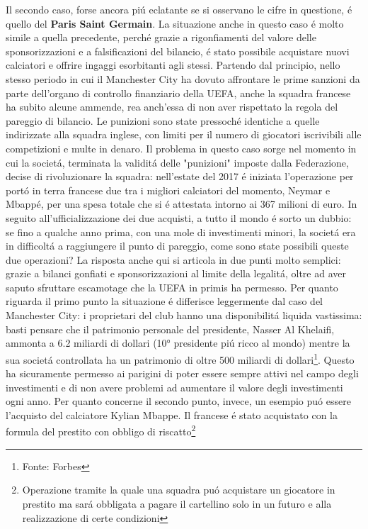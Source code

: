 \documentclass[
    corpo=12pt,
    oneside,
    evenboxes,
    tipotesi=triennale,
    stile=classica,
    oldstyle,
    autoretitolo,
    greek,
]{toptesi}
\begin{document}
\begin{interlinea}{1.5}
Il secondo caso, forse ancora pi\'u eclatante se si osservano le cifre in questione, \'e quello del \textbf{Paris Saint Germain}. 
La situazione anche in questo caso \'e molto simile a quella precedente, perch\'e grazie a rigonfiamenti del valore
delle sponsorizzazioni e a falsificazioni del bilancio, \'e stato possibile acquistare nuovi calciatori e offrire ingaggi esorbitanti agli stessi.
Partendo dal principio, nello stesso periodo in cui il Manchester City ha dovuto affrontare le prime sanzioni da parte dell'organo di controllo
finanziario della UEFA, anche la squadra francese ha subito alcune ammende, rea anch'essa di non aver rispettato la regola del pareggio di bilancio. 
Le punizioni sono state pressoch\'e identiche a quelle indirizzate alla squadra inglese, con limiti per il numero di giocatori iscrivibili alle 
competizioni e multe in denaro. Il problema in questo caso sorge nel momento in cui la societ\'a, terminata la validit\'a delle "punizioni"
imposte dalla Federazione, decise di rivoluzionare la squadra: nell'estate del 2017 \'e iniziata l'operazione per port\'o in terra francese
due tra i migliori calciatori del momento, Neymar e Mbapp\'e, per una spesa totale che si \'e attestata intorno ai 367 
milioni di euro. In seguito all'ufficializzazione dei due acquisti, a tutto il mondo \'e sorto un dubbio: se fino a qualche anno prima,
con una mole di investimenti minori, la societ\'a era in difficolt\'a a raggiungere il punto di pareggio, come sono state possibili queste due 
operazioni? La risposta anche qui si articola in due punti molto semplici: grazie a bilanci gonfiati e sponsorizzazioni al 
limite della legalit\'a, oltre ad aver saputo sfruttare escamotage che la UEFA in primis ha permesso. Per quanto riguarda il primo punto la situazione \'e
differisce leggermente dal caso del Manchester City: i proprietari del club hanno una disponibilit\'a liquida vastissima: basti pensare che il patrimonio
personale del presidente, Nasser Al Khelaifi, ammonta a 6.2 miliardi di dollari (10° presidente pi\'u ricco al mondo) mentre la sua societ\'a 
controllata ha un patrimonio di oltre 500 miliardi di dollari\footnote{Fonte: Forbes}. Questo ha sicuramente permesso ai parigini
di poter essere sempre attivi nel campo degli investimenti e di non avere problemi ad aumentare il valore degli investimenti ogni anno.
Per quanto concerne il secondo punto, invece, un esempio pu\'o essere l'acquisto del calciatore Kylian Mbappe. Il francese \'e stato acquistato 
con la formula del prestito con obbligo di riscatto\footnote{Operazione tramite la quale una squadra pu\'o acquistare un giocatore in prestito ma sar\'a obbligata a pagare il cartellino solo in un futuro e alla realizzazione di certe condizioni} 

\end{interlinea}
\end{document}
